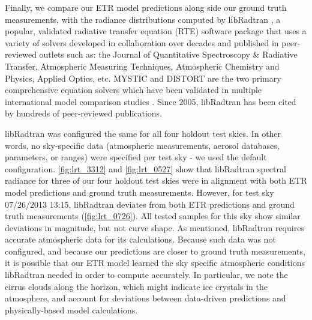 Finally, we compare our ETR model predictions along side our ground truth measurements, with the radiance distributions computed by libRadtran \citep{emde_libradtran}, a popular, validated radiative transfer equation (RTE) software package that uses a variety of solvers developed in collaboration over decades and published in peer-reviewed outlets such as: the Journal of Quantitative Spectroscopy \& Radiative Transfer, Atmospheric Measuring Techniques, Atmospheric Chemistry and Physics, Applied Optics, etc. MYSTIC \citep{buras_2011, mayer_2009, mayer_2005} and DISTORT \citep{buras_2011, dahlback_1991, stamnes_1988} are the two primary comprehensive equation solvers which have been validated in multiple international model comparison studies \citep{emde_2015, kokhanovsky_2010, cahalan_2005}. Since 2005, libRadtran has been cited by hundreds of peer-reviewed publications.

libRadtran was configured the same for all four holdout test skies. In other words, no sky-specific data (atmospheric measurements, aerosol databases, parameters, or ranges) were specified per test sky - we used the default configuration. \autoref{fig:lrt_3312} and \autoref{fig:lrt_0527} show that libRadtran spectral radiance for three of our four holdout test skies were in alignment with both ETR model predictions and ground truth measurements. However, for test sky 07/26/2013 13:15, libRadtran deviates from both ETR predictions and ground truth measurements (\autoref{fig:lrt_0726}). All tested samples for this sky show similar deviations in magnitude, but not curve shape. As mentioned, libRadtran requires accurate atmospheric data for its calculations. Because such data was not configured, and because our predictions are closer to ground truth measurements, it is possible that our ETR model learned the sky specific atmospheric conditions libRadtran needed in order to compute accurately. In particular, we note the cirrus clouds along the horizon, which might indicate ice crystals in the atmosphere, and account for deviations between data-driven predictions and physically-based model calculations.

